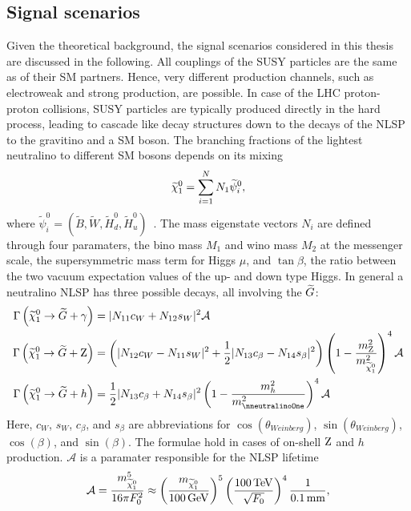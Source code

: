 \subsection{Signal scenarios}\label{sec:SMS}
Given the theoretical background, the signal scenarios considered in this thesis are discussed in the following. All couplings of the SUSY particles are the same as of their SM partners. Hence, very different production channels, such as electroweak and strong production, are possible. In case of the LHC proton-proton collisions, SUSY particles are typically produced directly in the hard process, leading to cascade like decay structures down to the decays of the NLSP to the gravitino and a SM boson. The branching fractions of the lightest neutralino to different SM bosons depends on its mixing
\begin{equation}
  \widetilde{\chi}^{0}_{1} = \sum_{i=1}^{N} N_{1} \widetilde{\psi}_i^0,
\end{equation}
where $\widetilde{\psi}_i^0=(\widetilde{B},\widetilde{W},\widetilde{H}_d^0,\widetilde{H}_u^0)$~\cite{NLSPDecay}. The mass eigenstate vectors $N_i$ are defined through four paramaters, the bino mass $M_1$ and wino mass $M_2$ at the messenger scale, the supersymmetric mass term for Higgs $\mu$, and $\tan{\beta}$, the ratio between the two vacuum expectation values of the up- and down type Higgs. In general a neutralino NLSP has three possible decays, all involving the $\widetilde{G}$:
\begin{align}
  \Gamma\left(\neutralinoOne\to\gravitino+\PGg\right) &= |N_{11}c_W+N_{12}s_W|^2 \mathcal{A}\\
  \Gamma\left(\neutralinoOne\to\gravitino+\PZ\right) &= \left(|N_{12}c_W - N_{11}s_W|^2 +\frac{1}{2}|N_{13}c_{\beta}-N_{14}s_{\beta}|^2\right)\left(1-\frac{m_{\PZ}^2}{m_{\neutralinoOne}^2}\right)^4 \mathcal{A}\\
  \Gamma\left(\neutralinoOne\to\gravitino+h\right) &= \frac{1}{2}|N_{13}c_{\beta}+N_{14}s_{\beta}|^2\left(1-\frac{m_h^2}{m_{\nneutralinoOne}^2}\right)^4 \mathcal{A}
\end{align}
Here, $c_W$, $s_W$, $c_\beta$, and $s_\beta$ are abbreviations for $\cos(\theta_{Weinberg})$, $\sin(\theta_{Weinberg})$, $\cos(\beta)$, and $\sin(\beta)$. The formulae hold in cases of on-shell $\mathrm{Z}$ and $h$ production. $\mathcal{A}$ is a paramater responsible for the NLSP lifetime~\cite{NLSP1,NLSP2}
\begin{equation}
\mathcal{A} = \frac{m_{\widetilde{\chi}^{0}_{1}}^5}{16\pi F_{0}^{2}}\approx\left(\frac{m_{\widetilde{\chi}^{0}_{1}}}{100\,\text{Ge\hspace{-.08em}V}}\right)^5\left(\frac{100\,\text{Te\hspace{-.08em}V}}{\sqrt{F_0}}\right)^4 \frac{1}{0.1\,\text{mm}},
\end{equation}
